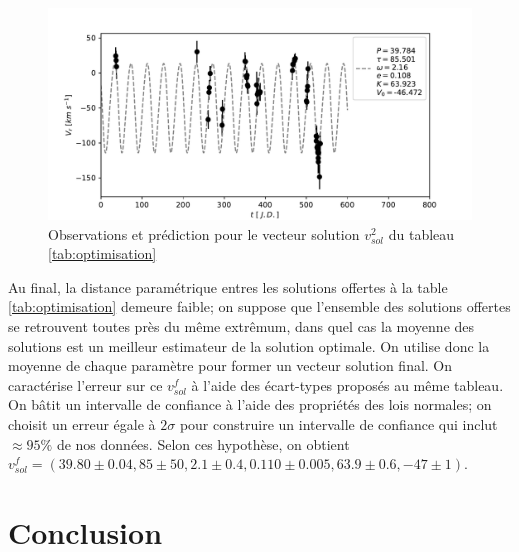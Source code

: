\documentclass{article}
\begin{document}
\begin{figure}[H]
	\includegraphics[scale=0.8]{imgs/optimisation/rho_CBr/chosen.pdf}
	\caption{Observations et prédiction pour le vecteur solution $v^2_{sol}$ du tableau \ref{tab:optimisation}}
	\label{fig:opti_finale}
\end{figure}

Au final, la distance paramétrique entres les solutions offertes à la table \ref{tab:optimisation} demeure faible; on suppose que l'ensemble des solutions offertes se retrouvent toutes près du même extrêmum, dans quel cas la moyenne des solutions est un meilleur estimateur de la solution optimale. On utilise donc la moyenne de chaque paramètre pour former un vecteur solution final. On caractérise l'erreur sur ce $v^f_{sol}$ à l'aide des écart-types proposés au même tableau. On bâtit un intervalle de confiance à l'aide des propriétés des lois normales; on choisit un erreur égale à $2 \sigma$ pour construire un intervalle de confiance qui inclut $\approx 95\%$ de nos données. Selon ces hypothèse, on obtient $v^f_{sol} = (39.80\pm0.04, 85\pm50, 2.1\pm0.4, 0.110\pm0.005, 63.9\pm0.6, -47\pm1)$.

\pagebreak

\section*{Conclusion}
\end{document}
